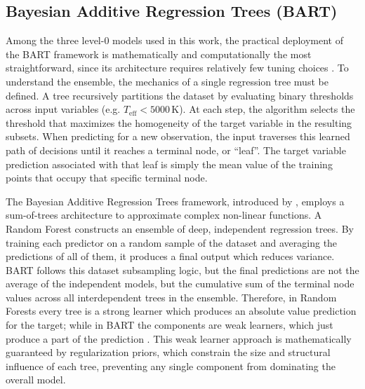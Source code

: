 \fi

\subsection{Bayesian Additive Regression Trees (BART)}
Among the three level-0 models used in this work, the practical deployment of the BART framework is mathematically and computationally the most straightforward, since its architecture requires relatively few tuning choices \citep{hill2020}. To understand the ensemble, the mechanics of a single regression tree must be defined. A tree recursively partitions the dataset by evaluating binary thresholds across input variables (e.g. $T_{\mathrm{eff}} < 5000\,\mathrm{K}$). At each step, the algorithm selects the threshold that maximizes the homogeneity of the target variable in the resulting subsets. When predicting for a new observation, the input traverses this learned path of decisions until it reaches a terminal node, or ``leaf''. The target variable prediction associated with that leaf is simply the mean value of the training points that occupy that specific terminal node.


The Bayesian Additive Regression Trees framework, introduced by \citet{chipman2010bart}, employs a sum-of-trees architecture to approximate complex non-linear functions. A Random Forest constructs an ensemble of deep, independent regression trees. By training each predictor on a random sample of the dataset and averaging the predictions of all of them, it produces a final output which reduces variance. BART follows this dataset subsampling logic, but the final predictions are not the average of the independent models, but the cumulative sum of the terminal node values across all interdependent trees in the ensemble. Therefore, in Random Forests every tree is a strong learner which produces an absolute value prediction for the target; while in BART the components are weak learners, which just produce a part of the prediction \citep{chipman2010bart}. This weak learner approach is mathematically guaranteed by regularization priors, which constrain the size and structural influence of each tree, preventing any single component from dominating the overall model.

